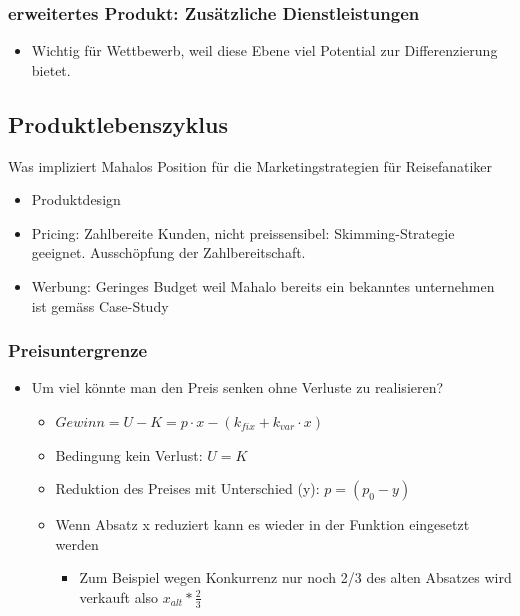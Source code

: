 \documentclass[a4paper]{article}
\begin{document}
    \subsubsection{erweitertes Produkt: Zusätzliche Dienstleistungen}
    \begin{itemize}
        \item Wichtig für Wettbewerb, weil diese Ebene viel Potential zur Differenzierung bietet.
    \end{itemize}

    \subsection{Produktlebenszyklus}
    Was impliziert Mahalos Position für die Marketingstrategien für Reisefanatiker 
    \begin{itemize}
        \item Produktdesign
        \item Pricing: Zahlbereite Kunden, nicht preissensibel:
        Skimming-Strategie geeignet. Ausschöpfung der Zahlbereitschaft.  
        \item Werbung: Geringes Budget weil Mahalo bereits ein bekanntes unternehmen ist gemäss Case-Study
    \end{itemize}

    \subsubsection{Preisuntergrenze}
    \begin{itemize}
        \item Um viel könnte man den Preis senken ohne Verluste zu realisieren?
        \begin{itemize}
            \item $Gewinn = U - K = p \cdot x - (k_{fix} + k_{var} \cdot x)$
            \item Bedingung kein Verlust: $U = K$
            \item Reduktion des Preises mit Unterschied (y): $p = (p_0 - y)$
            \item Wenn Absatz x reduziert kann es wieder in der Funktion eingesetzt werden
            \begin{itemize}
                \item Zum Beispiel wegen Konkurrenz nur noch 2/3 des alten Absatzes wird verkauft also $x_{alt} * \frac{2}{3}$ 
            \end{itemize}
        \end{itemize}
    \end{itemize}
\end{document}
